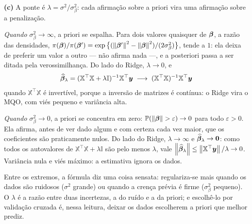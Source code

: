 \begin{solucao}
\smallskip
\textbf{(c)} A ponte é $\lambda=\sigma^2/\sigma_\beta^2$: cada afirmação sobre a priori
vira uma afirmação sobre a penalização.

\emph{Quando $\sigma_\beta^2\to\infty$}, a priori se espalha. Para dois valores
quaisquer de $\bm{\beta}$, a razão das densidades,
$\pi(\bm{\beta})/\pi(\bm{\beta}')=\exp\big\{(\left\lVert \bm{\beta}' \right\rVert^2-\left\lVert \bm{\beta} \right\rVert^2)/(2\sigma_\beta^2)\big\}$,
tende a $1$: ela deixa de preferir um valor a outro --- não afirma nada ---, e a
posteriori passa a ser ditada pela verossimilhança. Do lado do Ridge, $\lambda\to0$, e
\[
  \widehat{\bm{\beta}}_\lambda=(\mathbb{X}^\top\mathbb{X}+\lambda\mathbb{I})^{-1}\mathbb{X}^\top\bm y
  \;\longrightarrow\;(\mathbb{X}^\top\mathbb{X})^{-1}\mathbb{X}^\top\bm y
\]
quando $\mathbb{X}^\top\mathbb{X}$ é invertível, porque a inversão de matrizes é
contínua: o Ridge vira o MQO, com viés pequeno e variância alta.

\emph{Quando $\sigma_\beta^2\to0$}, a priori se concentra em zero:
$\mathbb{P}(\left\lVert \bm{\beta} \right\rVert>\varepsilon)\to0$ para todo $\varepsilon>0$. Ela afirma, antes de
ver dado algum e com certeza cada vez maior, que os coeficientes são praticamente
nulos. Do lado do Ridge, $\lambda\to\infty$ e $\widehat{\bm{\beta}}_\lambda\to\bm0$: como todos
os autovalores de $\mathbb{X}^\top\mathbb{X}+\lambda\mathbb{I}$ são pelo menos $\lambda$,
vale $\left\lVert \widehat{\bm{\beta}}_\lambda \right\rVert\le\left\lVert \mathbb{X}^\top\bm y \right\rVert/\lambda\to0$. Variância
nula e viés máximo: a estimativa ignora os dados.

Entre os extremos, a fórmula diz uma coisa sensata: regulariza-se mais quando os dados
são ruidosos ($\sigma^2$ grande) ou quando a crença prévia é firme ($\sigma_\beta^2$
pequeno). O $\lambda$ é a razão entre duas incertezas, a do ruído e a da priori; e
escolhê-lo por validação cruzada é, nessa leitura, deixar os dados escolherem a priori
que melhor prediz.
\end{solucao}
